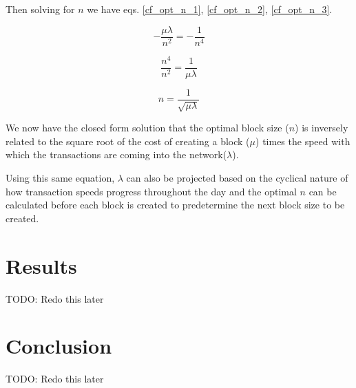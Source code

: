 \documentclass[conference]{IEEEtran}
\begin{document}
Then solving for $n$ we have eqs. \ref{cf_opt_n_1}, \ref{cf_opt_n_2}, \ref{cf_opt_n_3}.

\begin{equation}
-\frac{\mu\lambda}{n^2}=-\frac{1}{n^4}\label{cf_opt_n_1}
\end{equation}

\begin{equation}
\frac{n^4}{n^2}=\frac{1}{\mu\lambda}\label{cf_opt_n_2}
\end{equation}

\begin{equation}
n=\frac{1}{\sqrt{\mu\lambda}}\label{cf_opt_n_3}
\end{equation}

We now have the closed form solution that the optimal block size ($n$) is inversely related to
the square root of the cost of creating a block ($\mu$) times the speed with which the transactions 
are coming into the network($\lambda$). 

Using this same equation, $\lambda$ can also be projected based on the cyclical nature of how transaction
speeds progress throughout the day and the optimal $n$ can be calculated before each block is created to 
predetermine the next block size to be created. 

\section{Results}

TODO: Redo this later

\section{Conclusion}

TODO: Redo this later



\end{document}
